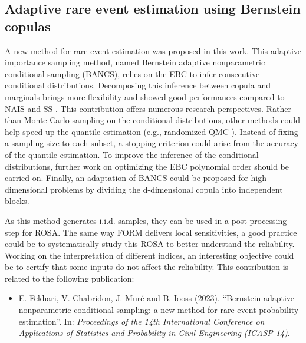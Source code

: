 \subsection*{Adaptive rare event estimation using Bernstein copulas}

A new method for rare event estimation was proposed in this work. 
This adaptive importance sampling method, named Bernstein adaptive nonparametric conditional sampling (BANCS), relies on the EBC to infer consecutive conditional distributions. 
Decomposing this inference between copula and marginals brings more flexibility and showed good performances compared to NAIS \citep{zhang_1996_NIS} and SS \citep{AuBeck2001}. 
This contribution offers numerous research perspectives. 
Rather than Monte Carlo sampling on the conditional distributions, other methods could help speed-up the quantile estimation (e.g., randomized QMC \citep{tuffin_2019}). 
Instead of fixing a sampling size to each subset, a stopping criterion could arise from the accuracy of the quantile estimation. 
To improve the inference of the conditional distributions, further work on optimizing the EBC polynomial order should be carried on. 
Finally, an adaptation of BANCS could be proposed for high-dimensional problems by dividing the d-dimensional copula into independent blocks.   

As this method generates i.i.d. samples, they can be used in a post-processing step for ROSA.
The same way FORM delivers local sensitivities, a good practice could be to systematically study this ROSA to better understand the reliability. 
Working on the interpretation of different indices, an interesting objective could be to certify that some inputs do not affect the reliability. 
This contribution is related to the following publication:
\begin{itemize}
    \footnotesize
    \item[\ding{125}] E. Fekhari, V. Chabridon, J. Muré and B. Iooss (2023). ``Bernstein adaptive nonparametric conditional sampling: a new method for rare event probability estimation''. In: \textit{Proceedings of the 14th International Conference on Applications of Statistics and Probability in Civil Engineering (ICASP 14)}.
\end{itemize}




